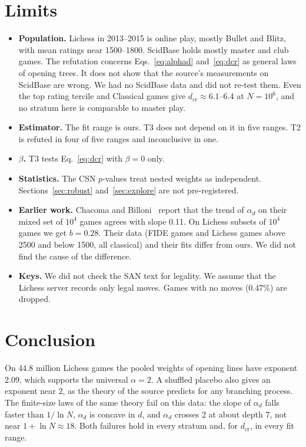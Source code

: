 \documentclass[11pt]{article}
\begin{document}
\section{Limits}
\begin{itemize}
\item \textbf{Population.} Lichess in 2013--2015 is online play, mostly Bullet and Blitz, with mean ratings near 1500--1800. ScidBase holds mostly master and club games. The refutation concerns Eqs.~\eqref{eq:alphad} and~\eqref{eq:dcr} as general laws of opening trees. It does not show that the source's measurements on ScidBase are wrong. We had no ScidBase data and did not re-test them. Even the top rating tercile and Classical games give $d_{\mathrm{cr}}\approx6.1$--6.4 at $N=10^6$, and no stratum here is comparable to master play.
\item \textbf{Estimator.} The fit range is ours. T3 does not depend on it in five ranges. T2 is refuted in four of five ranges and inconclusive in one.
\item \textbf{$\beta$.} T3 tests Eq.~\eqref{eq:dcr} with $\beta=0$ only.
\item \textbf{Statistics.} The CSN $p$-values treat nested weights as independent. Sections~\ref{sec:robust} and~\ref{sec:explore} are not pre-registered.
\item \textbf{Earlier work.} Chacoma and Billoni~\cite{chacoma} report that the trend of $\alpha_d$ on their mixed set of $10^4$ games agrees with slope 0.11. On Lichess subsets of $10^4$ games we get $b=0.28$. Their data (FIDE games and Lichess games above 2500 and below 1500, all classical) and their fits differ from ours. We did not find the cause of the difference.
\item \textbf{Keys.} We did not check the SAN text for legality. We assume that the Lichess server records only legal moves. Games with no moves (0.47\%) are dropped.
\end{itemize}

\section{Conclusion}
On 44.8 million Lichess games the pooled weights of opening lines have exponent 2.09, which supports the universal $\alpha=2$. A shuffled placebo also gives an exponent near 2, as the theory of the source predicts for any branching process. The finite-size laws of the same theory fail on this data: the slope of $\alpha_d$ falls faster than $1/\ln N$, $\alpha_d$ is concave in $d$, and $\alpha_d$ crosses 2 at about depth 7, not near $1+\ln N\approx18$. Both failures hold in every stratum and, for $d_{\mathrm{cr}}$, in every fit range.
\end{document}
